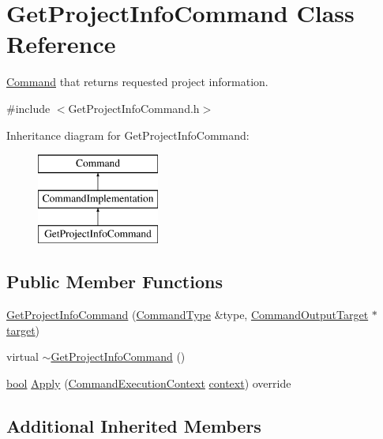 \hypertarget{class_get_project_info_command}{}\section{Get\+Project\+Info\+Command Class Reference}
\label{class_get_project_info_command}


\hyperlink{class_command}{Command} that returns requested project information.  




{\ttfamily \#include $<$Get\+Project\+Info\+Command.\+h$>$}

Inheritance diagram for Get\+Project\+Info\+Command\+:\begin{figure}[H]
\begin{center}
\leavevmode
\includegraphics[height=3.000000cm]{class_get_project_info_command}
\end{center}
\end{figure}
\subsection*{Public Member Functions}
\begin{DoxyCompactItemize}
\item 
\hyperlink{class_get_project_info_command_aa5026d2e2c7c7987a7e32677ebcba1ad}{Get\+Project\+Info\+Command} (\hyperlink{class_command_type}{Command\+Type} \&type, \hyperlink{class_command_output_target}{Command\+Output\+Target} $\ast$\hyperlink{lib_2expat_8h_a15a257516a87decb971420e718853137}{target})
\item 
virtual \hyperlink{class_get_project_info_command_aed7aca063179b695224ea5db3491a6a0}{$\sim$\+Get\+Project\+Info\+Command} ()
\item 
\hyperlink{mac_2config_2i386_2lib-src_2libsoxr_2soxr-config_8h_abb452686968e48b67397da5f97445f5b}{bool} \hyperlink{class_get_project_info_command_a53399f8060c4cc71770de89109c2ce34}{Apply} (\hyperlink{class_command_execution_context}{Command\+Execution\+Context} \hyperlink{structcontext}{context}) override
\end{DoxyCompactItemize}
\subsection*{Additional Inherited Members}


